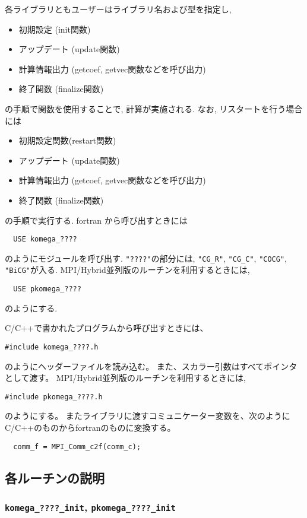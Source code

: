 \documentclass[12pt,titlepage]{jarticle}
\begin{document}
各ライブラリともユーザーはライブラリ名および型を指定し, 
\begin{itemize}
\item 初期設定 (init関数)
\item アップデート (update関数)
\item 計算情報出力 (getcoef, getvec関数などを呼び出力)
\item 終了関数 (finalize関数)
\end{itemize}
の手順で関数を使用することで, 計算が実施される. 
なお, リスタートを行う場合には
\begin{itemize}
\item 初期設定関数(restart関数)
\item アップデート (update関数)
\item 計算情報出力 (getcoef, getvec関数などを呼び出力)
\item 終了関数 (finalize関数)
\end{itemize}
の手順で実行する.
fortran から呼び出すときには
\begin{verbatim}
  USE komega_????
\end{verbatim}
のようにモジュールを呼び出す. \verb|"????"|の部分には,
\verb|"CG_R"|, \verb|"CG_C"|, \verb|"COCG"|, \verb|"BiCG"|が入る.
MPI/Hybrid並列版のルーチンを利用するときには,
\begin{verbatim}
  USE pkomega_????
\end{verbatim}
のようにする.

C/C++で書かれたプログラムから呼び出すときには、
\begin{verbatim}
#include komega_????.h
\end{verbatim}
のようにヘッダーファイルを読み込む。
また、スカラー引数はすべてポインタとして渡す。
MPI/Hybrid並列版のルーチンを利用するときには,
\begin{verbatim}
#include pkomega_????.h
\end{verbatim}
のようにする。
またライブラリに渡すコミュニケーター変数を、次のようにC/C++のものからfortranのものに変換する。
\begin{verbatim}
  comm_f = MPI_Comm_c2f(comm_c);
\end{verbatim}

\subsection{各ルーチンの説明}

\subsubsection{\texttt{komega\_????\_init}, \texttt{pkomega\_????\_init}}
\end{document}
